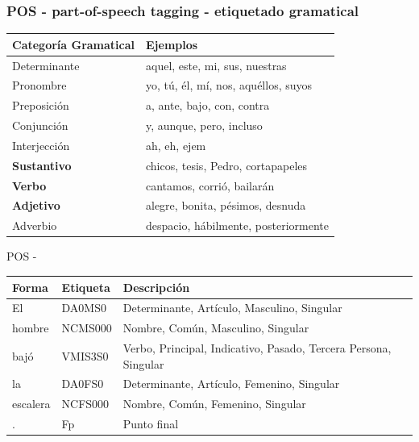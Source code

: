 \begin{frame}\fontsize{7.5pt}{7.8}\selectfont
  \frametitle{POS - part-of-speech tagging - etiquetado gramatical}

\begin{center}
\begin{tabular}{| l | l |}
 \hline
Categoría Gramatical & Ejemplos \\ \hline
Determinante & aquel, este, mi, sus, nuestras \\ \hline
Pronombre & yo, tú, él, mí, nos, aquéllos, suyos \\ \hline
Preposición & a, ante, bajo, con, contra\\ \hline
Conjunción & y, aunque, pero, incluso\\ \hline
Interjección & ah, eh, ejem\\ \hline
\textbf{Sustantivo} & chicos, tesis, Pedro, cortapapeles\\ \hline
\textbf{Verbo} & cantamos, corrió, bailarán\\ \hline
\textbf{Adjetivo} & alegre, bonita, pésimos, desnuda\\ \hline
Adverbio & despacio, hábilmente, posteriormente\\ \hline
\end{tabular}
\end{center}

  \begin{alertblock}{POS - }
  \begin{table}
    \begin{tabular}{| l | l | l |}
    \hline
    Forma &  Etiqueta & Descripción \\ \hline
    El & DA0MS0 & Determinante, Artículo, Masculino, Singular\\
    hombre & NCMS000 & Nombre, Común, Masculino, Singular  \\ 
    bajó & VMIS3S0 & Verbo, Principal, Indicativo, Pasado, Tercera Persona, Singular\\ 
    la & DA0FS0 & Determinante, Artículo, Femenino, Singular\\ 
    escalera& NCFS000 & Nombre, Común, Femenino, Singular \\ 
    .& Fp& Punto final\\ \hline
  \end{tabular}
  \end{table}
  \end{alertblock}

\end{frame}

